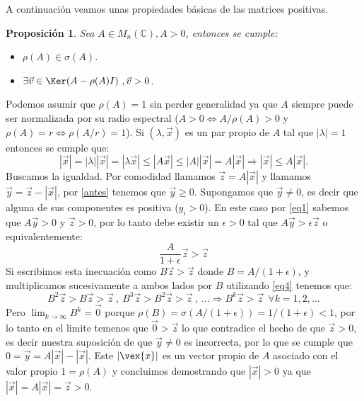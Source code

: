 \documentclass[size=a4, parskip=half, titlepage=false, toc=flat, toc=bib, 12pt]{scrartcl}
\makeatletter
\renewenvironment{proof}[1][\proofname] {\par\pushQED{\qed}\normalfont\topsep6\p@\@plus6\p@\relax\trivlist\item[\hskip\labelsep\itshape\tgpaella#1\@addpunct{.}]\ignorespaces}{\popQED\endtrivlist\@endpefalse}
\theoremstyle{theorem-style}
\newtheorem{nprop}{Proposición}[section]
\theoremstyle{definition-style}
\theoremstyle{remark-style}
\theoremstyle{example-style}
\theoremstyle{definition-style}
\theoremstyle{remark-style}
\makeatother
\begin{document}
A continuación veamos unas propiedades básicas de las matrices positivas.

\begin{nprop}
\label{existevector}
Sea $A \in M_n(\mathbb{C}), A > 0$, entonces se cumple:
\begin{itemize}
\item $\rho(A) \in \sigma(A)$.
\item $\exists \vec{v} \in \Ker(A - \rho(A) I) \ , \vec{v} > 0$.
\end{itemize}
\end{nprop}
\begin{proof}
Podemos asumir que $\rho(A) = 1$ sin perder generalidad ya que $A$ siempre puede ser normalizada por su radio espectral ($A >0 \Leftrightarrow A / \rho(A) > 0$ y $\rho(A) = r \Leftrightarrow \rho(A/r) = 1$). Si $(\lambda, \vec{x})$ es un par propio de $A$ tal que $|\lambda| = 1$ entonces se cumple que:
\begin{equation} \label{antes} |\vec{x}| = |\lambda||\vec{x}| = |\lambda \vec{x}| \leq |A \vec{x}| \leq |A||\vec{x}| = A |\vec{x}| \Rightarrow |\vec{x}| \leq A |\vec{x}|.  \end{equation}
Buscamos la igualdad. Por comodidad llamamos $\vec{z} = A |\vec{x}|$ y llamamos $\vec{y} = \vec{z} - |\vec{x}|$, por \ref{antes} tenemos que $\vec{y} \geq 0$. Supongamos que $\vec{y} \neq 0$, es decir que alguna de sus componentes es positiva ($y_i > 0$). En este caso por \ref{eq1} sabemos que $A \vec{y} > 0$ y $\vec{z} > 0$, por lo tanto debe existir un $\epsilon >0$ tal que $A\vec{y} > \epsilon \vec{z}$ o equivalentemente:
$$\frac{A}{1 + \epsilon} \vec{z} > \vec{z} $$
Si escribimos esta inecuación como $B \vec{z} > \vec{z}$ donde $B = A /(1 + \epsilon)$, y multiplicamos sucesivamente a ambos lados por $B$ utilizando \ref{eq4} tenemos que:
$$B^2 \vec{z} > B \vec{z} > \vec{z} \ , \ B^3 \vec{z} > B^2 \vec{z} > \vec{z} \ , \ \dots \Rightarrow B^k \vec{z} > \vec{z} \ \ \forall k = 1, 2, \dots $$
Pero $\lim_{k \to \infty}B^k = \vec{0}$ porque $\rho(B) = \sigma(A/(1 + \epsilon)) = 1/(1 + \epsilon) < 1$, por lo tanto en el limite temenos que $\vec{0} > \vec{z}$ lo que contradice el hecho de que $\vec{z} >0$, es decir nuestra suposición de que $\vec{y} \neq 0$ es incorrecta, por lo que se cumple que $0 = \vec{y} = A |\vec{x}| - |\vec{x}|$. Este $|\vex{x}|$ es un vector propio de $A$ asociado con el valor propio $1 = \rho(A)$ y concluimos demostrando que $|\vec{x}|>0$ ya que $|\vec{x}| = A |\vec{x}| = \vec{z} > 0$.
\end{proof}
\end{document}
